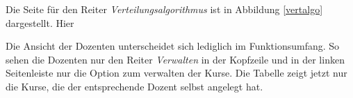         	Die Seite für den Reiter \textit{Verteilungsalgorithmus} ist in Abbildung \ref{vertalgo} dargestellt.
        	Hier 
        	
        	Die Ansicht der Dozenten unterscheidet sich lediglich im Funktionsumfang.
        	So sehen die Dozenten nur den Reiter \textit{Verwalten} in der Kopfzeile und in der linken Seitenleiste nur die Option zum verwalten der Kurse.
        	Die Tabelle zeigt jetzt nur die Kurse, die der entsprechende Dozent selbst angelegt hat.  
        	
        	
        	
        	
        	
        	
        	
        	
        	